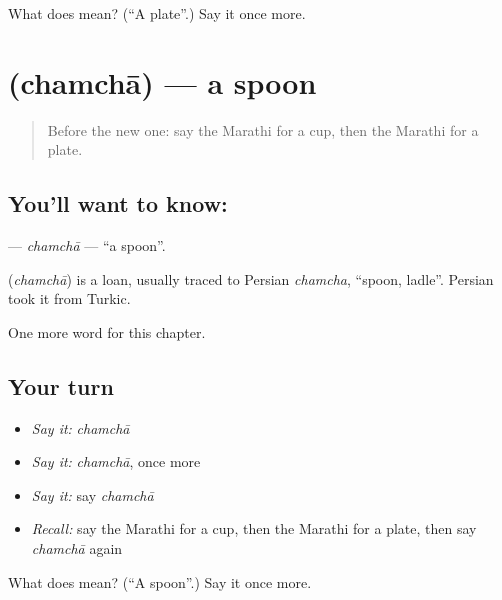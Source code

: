 \begin{tcolorbox}[breakable,colback=teal!4,colframe=teal!35!black,title={Before you move on}]
What does  mean? (\textquotedblleft{}A plate\textquotedblright{}.) Say it once more.
\end{tcolorbox}
\section[\texorpdfstring{\mr{चमचा} (chamchā)}{चमचा (chamchā)}]{ (chamchā) — a spoon}

\label{lesson:MR-C92-chamcha}



\begin{quote}
Before the new one: say the Marathi for a cup, then the Marathi for a plate.
\end{quote}

\subsection*{You'll want to know: }
\textbf{} — \emph{chamchā} — \textquotedblleft{}a spoon\textquotedblright{}.

\begin{cousinweb}
\textbf{} (\emph{chamchā}) is a loan, usually traced to Persian \emph{chamcha}, \textquotedblleft{}spoon, ladle\textquotedblright{}. Persian took it from Turkic.
\end{cousinweb}

\begin{grammarlens}[title={What you've built}]
One more word for this chapter.
\end{grammarlens}

\subsection*{Your turn}
\begin{itemize}
\raggedright
  \item \emph{Say it:} \emph{chamchā}
  \item \emph{Say it:} \emph{chamchā}, once more
  \item \emph{Say it:} say \emph{chamchā}
  \item \emph{Recall:} say the Marathi for a cup, then the Marathi for a plate, then say \emph{chamchā} again
\end{itemize}

\begin{tcolorbox}[breakable,colback=teal!4,colframe=teal!35!black,title={Before you move on}]
What does  mean? (\textquotedblleft{}A spoon\textquotedblright{}.) Say it once more.
\end{tcolorbox}
